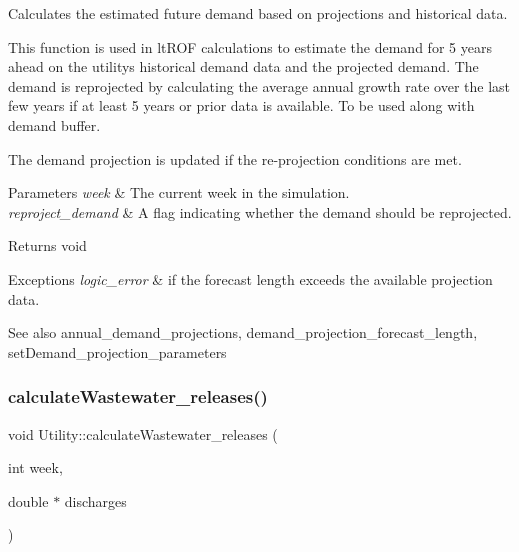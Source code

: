 Calculates the estimated future demand based on projections and historical data. 

This function is used in lt\+R\+OF calculations to estimate the demand for 5 years ahead on the utility\textquotesingle{}s historical demand data and the projected demand. The demand is reprojected by calculating the average annual growth rate over the last few years if at least 5 years or prior data is available. To be used along with demand buffer.

The demand projection is updated if the re-\/projection conditions are met.


\begin{DoxyParams}{Parameters}
{\em week} & The current week in the simulation. \\
\hline
{\em reproject\+\_\+demand} & A flag indicating whether the demand should be reprojected.\\
\hline
\end{DoxyParams}
\begin{DoxyReturn}{Returns}
void
\end{DoxyReturn}

\begin{DoxyExceptions}{Exceptions}
{\em logic\+\_\+error} & if the forecast length exceeds the available projection data.\\
\hline
\end{DoxyExceptions}
\begin{DoxySeeAlso}{See also}
annual\+\_\+demand\+\_\+projections, demand\+\_\+projection\+\_\+forecast\+\_\+length, set\+Demand\+\_\+projection\+\_\+parameters 
\end{DoxySeeAlso}
\mbox{\label{classUtility_a5feecc73d561de022eb6ba3c657b3dbc}} 
\subsubsection{\texorpdfstring{calculate\+Wastewater\+\_\+releases()}{calculateWastewater\_releases()}}
{\footnotesize\ttfamily void Utility\+::calculate\+Wastewater\+\_\+releases (\begin{DoxyParamCaption}\item[{int}]{week,  }\item[{double $\ast$}]{discharges }\end{DoxyParamCaption})}



